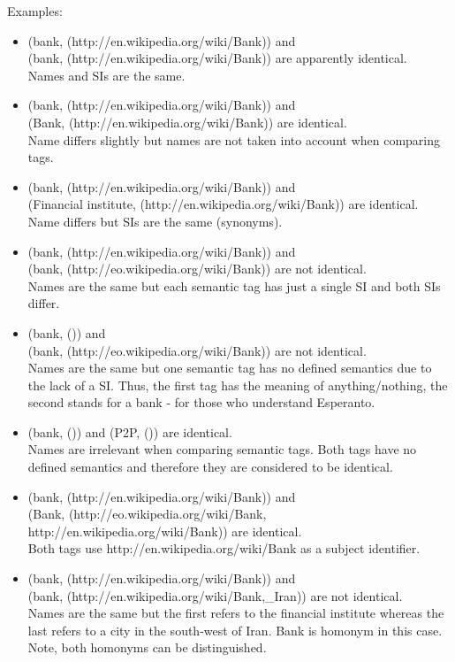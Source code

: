 Examples:
\begin{itemize}
    \item (bank, (http://en.wikipedia.org/wiki/Bank)) and \\ (bank, (http://en.wikipedia.org/wiki/Bank)) are apparently identical. \\ Names and SIs are the same.

    \item (bank, (http://en.wikipedia.org/wiki/Bank)) and \\ (Bank, (http://en.wikipedia.org/wiki/Bank)) are identical. \\ Name differs slightly but names are not taken into account when comparing tags.

    \item (bank, (http://en.wikipedia.org/wiki/Bank)) and \\ (Financial institute, (http://en.wikipedia.org/wiki/Bank)) are identical. \\ Name differs but SIs are the same (synonyms).

    \item (bank, (http://en.wikipedia.org/wiki/Bank)) and \\ (bank, (http://eo.wikipedia.org/wiki/Bank)) are not identical. \\ Names are the same but each semantic tag has just a single SI and both SIs differ.

    \item (bank, ()) and \\ (bank, (http://eo.wikipedia.org/wiki/Bank)) are not identical. \\ Names are the same but one semantic tag has no defined semantics due to the lack of a SI. Thus, the first tag has the meaning of anything/nothing, the second stands for a bank - for those who understand Esperanto.

    \item (bank, ()) and (P2P, ()) are identical. \\ Names are irrelevant when comparing semantic tags. Both tags have no defined semantics and therefore they are considered to be identical.

    \item (bank, (http://en.wikipedia.org/wiki/Bank)) and \\ (Bank, (http://eo.wikipedia.org/wiki/Bank, \\ http://en.wikipedia.org/wiki/Bank)) are identical. \\ Both tags use http://en.wikipedia.org/wiki/Bank as a subject identifier.

    \item (bank, (http://en.wikipedia.org/wiki/Bank)) and \\ (bank, (http://en.wikipedia.org/wiki/Bank,\_Iran)) are not identical. \\ Names are the same but the first refers to the financial institute whereas the last refers to a city in the south-west of Iran. Bank is homonym in this case. Note, both homonyms can be distinguished.

\end{itemize}

